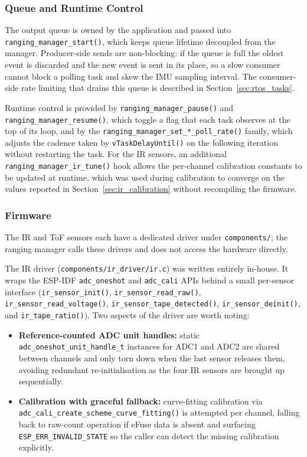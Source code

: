 \subsubsection{Queue and Runtime Control}

The output queue is owned by the application and passed into \texttt{ranging\_manager\_start()}, which keeps queue lifetime decoupled from the manager. Producer-side sends are non-blocking: if the queue is full the oldest event is discarded and the new event is sent in its place, so a slow consumer cannot block a polling task and skew the IMU sampling interval. The consumer-side rate limiting that drains this queue is described in Section~\ref{sec:rtos_tasks}.

Runtime control is provided by \texttt{ranging\_manager\_pause()} and \texttt{ranging\_manager\_resume()}, which toggle a flag that each task observes at the top of its loop, and by the \texttt{ranging\_manager\_set\_*\_poll\_rate()} family, which adjusts the cadence taken by \texttt{vTaskDelayUntil()} on the following iteration without restarting the task. For the IR sensors, an additional \texttt{ranging\_manager\_ir\_tune()} hook allows the per-channel calibration constants to be updated at runtime, which was used during calibration to converge on the values reported in Section~\ref{sec:ir_calibration} without recompiling the firmware.

\subsubsection{Firmware}

The IR and ToF sensors each have a dedicated driver under \texttt{components/}; the ranging manager calls these drivers and does not access the hardware directly.

The IR driver (\texttt{components/ir\_driver/ir.c}) was written entirely in-house. It wraps the ESP-IDF \texttt{adc\_oneshot} and \texttt{adc\_cali} APIs behind a small per-sensor interface (\texttt{ir\_sensor\_init()}, \texttt{ir\_sensor\_read\_raw()}, \texttt{ir\_sensor\_read\_voltage()}, \texttt{ir\_sensor\_tape\_detected()}, \texttt{ir\_sensor\_deinit()}, and \texttt{ir\_tape\_ratio()}). Two aspects of the driver are worth noting:
\begin{itemize}
    \item \textbf{Reference-counted ADC unit handles:} static \texttt{adc\_oneshot\_unit\_handle\_t} instances for ADC1 and ADC2 are shared between channels and only torn down when the last sensor releases them, avoiding redundant re-initialisation as the four IR sensors are brought up sequentially.
    \item \textbf{Calibration with graceful fallback:} curve-fitting calibration via \texttt{adc\_cali\_create\_scheme\_curve\_fitting()} is attempted per channel, falling back to raw-count operation if eFuse data is absent and surfacing \texttt{ESP\_ERR\_INVALID\_STATE} so the caller can detect the missing calibration explicitly.
\end{itemize}

